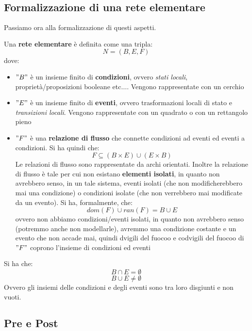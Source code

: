 \subsection{Formalizzazione di una rete elementare}
Passiamo ora alla formalizzazione di questi aspetti.\\
\begin{definizione}
  Una \textbf{rete elementare} è definita come una tripla:
  \[N=(B, E, F)\]
  dove:
  \begin{itemize}
    \item $"B"$ è un insieme finito di \textbf{condizioni}, ovvero \textit{stati
      locali}, proprietà/proposizioni booleane etc$\ldots$. Vengono
    rappresentate con un cerchio 
    \item $"E"$ è un insieme finito di \textbf{eventi}, ovvero trasformazioni
    locali di stato e \textit{transizioni locali}. Vengono rappresentate con un
    quadrato o con un rettangolo pieno
    \item $"F"$ è una \textbf{relazione di flusso} che connette condizioni ad
    eventi ed eventi a condizioni. Si ha quindi che:
    \[F\subseteq (B\times E)\cup(E\times B)\]
    Le relazioni di flusso sono rappresentate da archi orientati. Inoltre la
    relazione di flusso è tale per cui non esistano \textbf{elementi isolati},
    in quanto non avrebbero senso, in un tale sistema, eventi isolati (che non
    modificherebbero mai una condizione) o condizioni isolate (che non
    verrebbero mai modificate da un evento). Si ha, formalmente, che: 
    \[dom(F)\cup ran(F)=B\cup E\]
    ovvero non abbiamo condizioni/eventi isolati, in quanto non avrebbero senso
    (potremmo anche non modellarle), avremmo una condizione costante e un
    evento che non accade mai, quindi dvigili del fuocoo e codvigili del fuocoo di $"F"$ coprono
    l'insieme di condizioni ed eventi
  \end{itemize}
  Si ha che:
  \[B\cap E = \emptyset\]
  \[B\cup E \neq \emptyset\]
  Ovvero gli insiemi delle condizioni e degli eventi sono tra loro disgiunti e
  non vuoti.\\
  \subsection{Pre e Post}
  \begin{definizione}
    

\end{definizione}
\end{definizione}
